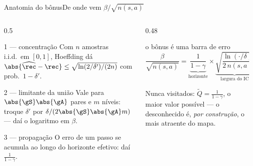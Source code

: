 \documentclass[aspectratio=169, 11pt]{beamer}
\newcommand{\Qtil}{\widetilde{Q}}
\newcommand{\Rhat}{\widehat{\rec}}
\begin{document}
\begin{frame}{Anatomia do bônus}{De onde vem $\beta/\sqrt{n(s,a)}$}
  \begin{columns}[T]
    \begin{column}{0.5\textwidth}
      \begin{teobox}{1 --- concentração}
        Com $n$ amostras i.i.d.\ em $[0,1]$, Hoeffding dá
        $\abs{\Rhat - \rec} \le \sqrt{\ln(2/\delta')/(2n)}$ com prob.\ $1-\delta'$.
      \end{teobox}
      \begin{teobox}{2 --- limitante da união}
        Vale para $\abs{\gS}\abs{\gA}$ pares e $m$ níveis: troque $\delta'$ por
        $\delta/(2\abs{\gS}\abs{\gA}m)$ --- daí o logaritmo em $\beta$.
      \end{teobox}
      \begin{teobox}{3 --- propagação}
        O erro de um passo se acumula ao longo do horizonte efetivo: daí
        $\tfrac{1}{1-\gamma}$.
      \end{teobox}
    \end{column}
    \begin{column}{0.48\textwidth}
      \begin{defbox}{o bônus é uma barra de erro}
        \[
          \frac{\beta}{\sqrt{n(s,a)}}
          =
          \underbrace{\frac{1}{1-\gamma}}_{\text{horizonte}}
          \times
          \underbrace{\sqrt{\frac{\ln(\cdot/\delta)}{2\,n(s,a)}}}_{\text{largura do IC}}
        \]
      \end{defbox}
      \begin{ideiabox}
        Nunca visitados: $\Qtil = \tfrac{1}{1-\gamma}$, o maior valor possível ---
        o desconhecido é, \emph{por construção}, o mais atraente do mapa.
      \end{ideiabox}
    \end{column}
  \end{columns}
\end{frame}
\end{document}
